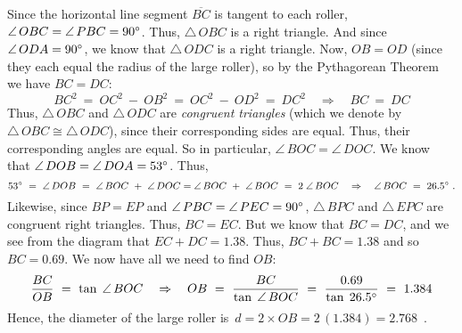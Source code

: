 \begin{exmp}
 Since the horizontal line segment $\overline{BC}$ is tangent to each roller, $\angle\,OBC =
 \angle\,PBC = 90^\circ$. Thus,
 $\triangle\,OBC$ is a right triangle. And since $\angle\,ODA = 90^\circ$, we know that
 $\triangle\,ODC$ is a right triangle. Now, $OB = OD$ (since they each equal the radius of the large
 roller), so by the Pythagorean Theorem we have $BC = DC$:
 \begin{displaymath}
  BC^2 ~=~ OC^2 ~-~ OB^2 ~=~ OC^2 ~-~ OD^2 ~=~ DC^2 \quad\Rightarrow\quad BC ~=~ DC
 \end{displaymath}
 Thus, $\triangle\,OBC$ and $\triangle\,ODC$ are \emph{congruent triangles} (which we denote by $\triangle\,OBC \cong \triangle\,ODC$), since their corresponding
 sides are equal. Thus, their corresponding angles are equal. So in particular, $\angle\,BOC =
 \angle\,DOC$. We know that $\angle\,DOB = \angle\,DOA = 53^\circ$. Thus,
 \begin{displaymath}
  53^\circ ~=~ \angle\,DOB ~=~ \angle\,BOC ~+~ \angle\,DOC = \angle\,BOC ~+~ \angle\,BOC ~=~
  2\;\angle\,BOC \quad\Rightarrow\quad \angle\,BOC ~=~ 26.5^\circ ~.
 \end{displaymath}
 Likewise, since $BP = EP$ and $\angle\,PBC = \angle\,PEC = 90^\circ$, $\triangle\,BPC$ and
 $\triangle\,EPC$ are congruent right triangles. Thus, $BC = EC$. But we know that
 $BC = DC$, and we see from the diagram that $EC + DC = 1.38$. Thus, $BC + BC = 1.38$ and so
 $BC = 0.69$. We now have all we need to find $OB$:
 \begin{displaymath}
  \frac{BC}{OB} ~=~ \tan\;\angle\,BOC \quad\Rightarrow\quad OB ~=~ \frac{BC}{\tan\;\angle\,BOC} ~=~
  \frac{0.69}{\tan\;26.5^\circ} ~=~ 1.384
 \end{displaymath}
 Hence, the diameter of the large roller is $\,d = 2 \times OB = 2\,(1.384) = \boxed{2.768}$~.
\end{exmp}
\divider
\newpage
